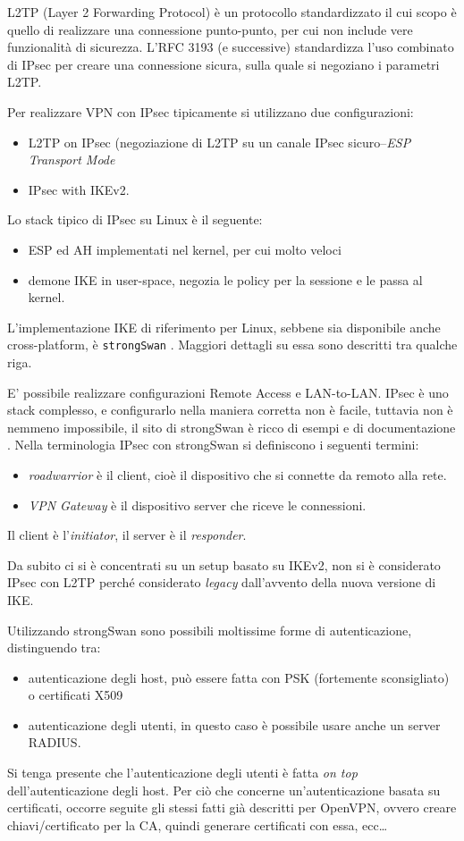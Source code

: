 L2TP (Layer 2 Forwarding Protocol) è un protocollo standardizzato il cui scopo è quello
di realizzare una connessione punto-punto, per cui non include vere funzionalità
di sicurezza. L'RFC 3193 (e successive) standardizza l'uso combinato di IPsec per creare una
connessione sicura, sulla quale si negoziano
i parametri L2TP.


Per realizzare VPN con IPsec tipicamente si utilizzano due configurazioni:
\begin{itemize}
  \item L2TP on IPsec (negoziazione di L2TP su un canale IPsec sicuro--\textit{ESP Transport Mode}
  \item IPsec with IKEv2.
\end{itemize}


Lo stack tipico di IPsec su Linux è il seguente:
\begin{itemize}
  \item ESP ed AH implementati nel kernel, per cui molto veloci
  \item demone IKE in user-space, negozia le policy per la sessione e le
  passa al kernel.
\end{itemize}
L'implementazione IKE di riferimento per Linux, sebbene sia disponibile anche
cross-platform, è \texttt{strongSwan} \cite{strongswan}. Maggiori dettagli su essa sono descritti
tra qualche riga.


E' possibile realizzare configurazioni Remote Access e LAN-to-LAN. IPsec è uno stack
complesso, e configurarlo nella maniera corretta non è facile, tuttavia non è nemmeno
impossibile, il sito di strongSwan è ricco di esempi e di documentazione \cite{strongswan-example}.
Nella terminologia IPsec con strongSwan si definiscono i seguenti termini:
\begin{itemize}
  \item \textit{roadwarrior} è il client, cioè il dispositivo che si connette da remoto alla rete.
  \item \textit{VPN Gateway} è il dispositivo server che riceve le connessioni.
\end{itemize}
Il client è l'\textit{initiator},
il server è il \textit{responder}.

Da subito ci si è concentrati su un setup basato su IKEv2, non si è considerato IPsec con L2TP
perché considerato \textit{legacy} dall'avvento della nuova versione di IKE.

Utilizzando strongSwan sono possibili moltissime forme di autenticazione, distinguendo tra:
\begin{itemize}
  \item autenticazione degli host, può essere fatta con PSK (fortemente sconsigliato) o certificati X509
  \item autenticazione degli utenti, in questo caso è possibile usare anche un
  server RADIUS.
\end{itemize}
Si tenga presente che l'autenticazione degli utenti è fatta \textit{on top} dell'autenticazione
degli host.
Per ciò che concerne un'autenticazione basata su certificati, occorre seguite gli stessi
fatti già descritti per OpenVPN, ovvero creare chiavi/certificato per la CA, quindi generare
certificati con essa, ecc\ldots


